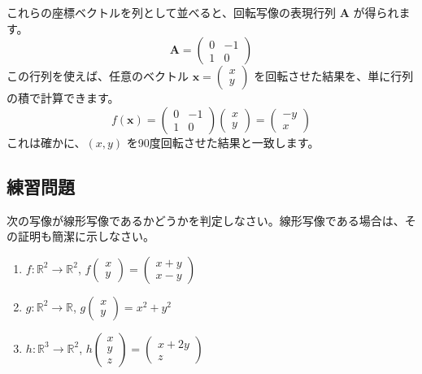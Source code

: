 \begin{ex}[2次元平面上の回転写像の表現行列]
これらの座標ベクトルを列として並べると、回転写像の表現行列 $\bm{A}$ が得られます。
\[\bm{A} = \begin{pmatrix} 0 & -1 \\ 1 & 0 \end{pmatrix}\]
この行列を使えば、任意のベクトル $\bm{x} = \begin{pmatrix} x \\ y \end{pmatrix}$ を回転させた結果を、単に行列の積で計算できます。$$f(\bm{x}) = \begin{pmatrix} 0 & -1 \\ 1 & 0 \end{pmatrix} \begin{pmatrix} x \\ y \end{pmatrix} = \begin{pmatrix} -y \\ x \end{pmatrix}$$
これは確かに、$(x,y)$ を90度回転させた結果と一致します。
\end{ex}

\subsection{練習問題}
\begin{quiz}
次の写像が線形写像であるかどうかを判定しなさい。線形写像である場合は、その証明も簡潔に示しなさい。
\begin{enumerate}
\item $f: \mathbb{R}^2 \to \mathbb{R}^2$, $f\begin{pmatrix} x \\ y \end{pmatrix} = \begin{pmatrix} x+y \\ x-y \end{pmatrix}$
\item $g: \mathbb{R}^2 \to \mathbb{R}$, $g\begin{pmatrix} x \\ y \end{pmatrix} = x^2 + y^2$
\item $h: \mathbb{R}^3 \to \mathbb{R}^2$, $h\begin{pmatrix} x \\ y \\ z \end{pmatrix} = \begin{pmatrix} x+2y \\ z \end{pmatrix}$
\end{enumerate}
\end{quiz}


